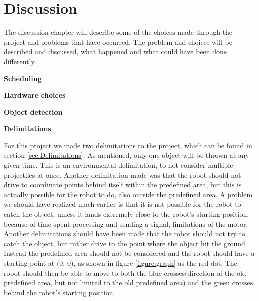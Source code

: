 \chapter{Discussion}
\label{chap:Discussion}
The discussion chapter will describe some of the choices made through the project and problems that have occurred. The problem and choices will be described and discussed, what happened and what could have been done differently. 

\textbf{Scheduling}



\textbf{Hardware choices}

\textbf{Object detection}


\textbf{Delimitations}

For this project we made two delimitations to the project, which can be found in section \ref{sec:Delimitations}. As mentioned, only one object will be thrown at any given time. This is an environmental delimitation, to not consider multiple projectiles at once. \newline
Another delimitation made was that the robot should not drive to coordinate points behind itself within the predefined area, but this is actually possible for the robot to do, also outside the predefined area. A problem we should have realized much earlier is that it is not possible for the robot to catch the object, unless it lands extremely close to the robot’s starting position, because of time spent processing and sending a signal, limitations of the motor. Another delimitations should have been made that the robot should not try to catch the object, but rather drive to the point where the object hit the ground. \newline
Instead the predefined area should not be considered and the robot should have a starting point at (0, 0), as shown in figure \ref{figure:graph} as the red dot. The robot should then be able to move to both the blue crosses(direction of the old predefined area, but not limited to the old predefined area) and the green crosses behind the robot’s starting position. 


